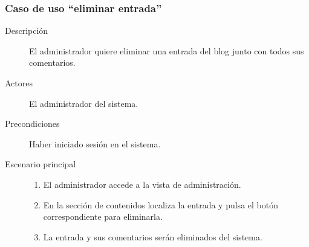 \subsubsection{Caso de uso ``eliminar entrada''}
\begin{description}
\item[Descripción] El administrador quiere eliminar una entrada del blog junto con todos sus comentarios.
\item[Actores] El administrador del sistema.
\item[Precondiciones] Haber iniciado sesión en el sistema.
\item[Escenario principal] \hfill
						 	\begin{enumerate}
							\item El administrador accede a la vista de administración.
							\item En la sección de contenidos localiza la entrada y pulsa el botón correspondiente para eliminarla.
							\item La entrada y sus comentarios serán eliminados del sistema.
							\end{enumerate}
\end{description}

